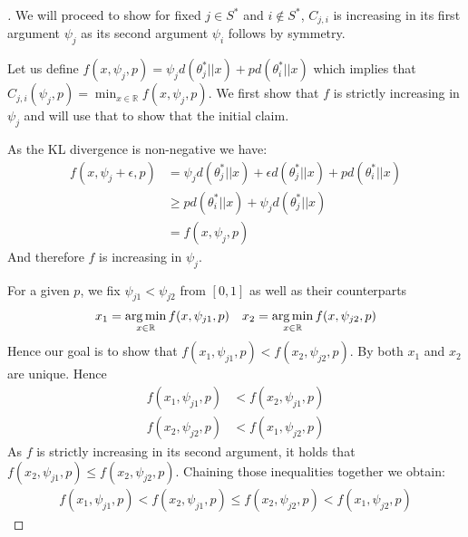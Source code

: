 \begin{proof}[]
  We will proceed to show for fixed $j \in S^*$ and $i \notin S^*$, $C_{j, i}$
  is increasing in its first argument $\psi_j$ as its second argument $\psi_i$
  follows by symmetry.

  Let us define $f(x, \psi_j, p) = \psi_j d(\theta_j^*||x) + p d(\theta_i^*||x)$
  which implies that $C_{j, i}(\psi_j, p) = \min_{x \in \mathbb{R}} f(x, \psi_j,
  p)$. We first show that $f$ is strictly increasing in $\psi_j$ and will use
  that to show that the initial claim.

  As the KL divergence is non-negative we have:
  \begin{align}
    f(x, \psi_j + \epsilon, p) &= \psi_j d(\theta_j^*||x) + \epsilon
        d(\theta_j^*||x) + p d(\theta_i^*||x) \\
      &\geq p d(\theta_i^*||x) + \psi_j d(\theta_j^*||x)\\
      &= f(x, \psi_j, p)
  \end{align}
  And therefore $f$ is increasing in $\psi_j$.

  For a given $p$, we fix $\psi_{j1} < \psi_{j2}$ from $[0, 1]$ as well as their
  counterparts
  \begin{align}
    &x_1 = \operatorname*{arg\,min}_{x \in \mathbb{R}} f(x, \psi_{j1}, p)
    &x_2 = \operatorname*{arg\,min}_{x \in \mathbb{R}} f(x, \psi_{j2}, p)
  \end{align}
  Hence our goal is to show that $f(x_1, \psi_{j1}, p) < f(x_2, \psi_{j2}, p)$.
  By  both $x_1$ and $x_2$ are unique. Hence
  \begin{align}
    f(x_1, \psi_{j1}, p) &< f(x_2, \psi_{j1}, p) \\
    f(x_2, \psi_{j2}, p) &< f(x_1, \psi_{j2}, p)
  \end{align}
  As $f$ is strictly increasing in its second argument, it holds that $f(x_2,
  \psi_{j1}, p) \leq f(x_2, \psi_{j2}, p)$. Chaining those inequalities together
  we obtain:
  \begin{align}
    f(x_1, \psi_{j1}, p) < f(x_2, \psi_{j1}, p)  \leq f(x_2, \psi_{j2}, p) <
        f(x_1, \psi_{j2}, p)
  \end{align}
\end{proof}


